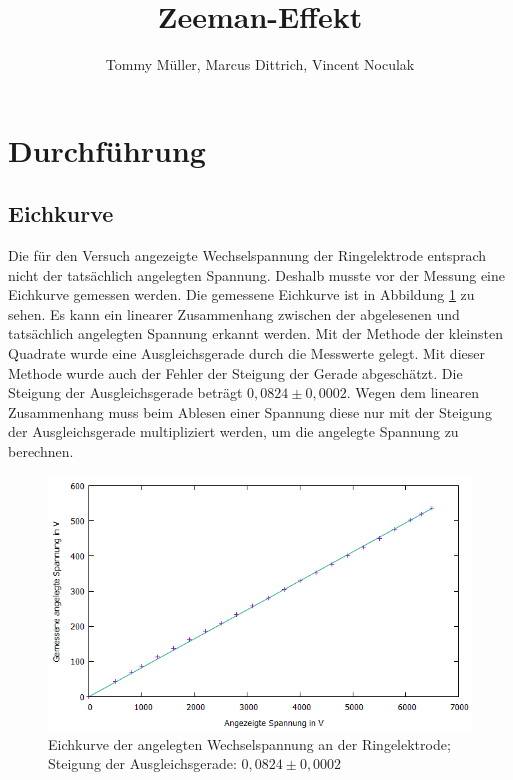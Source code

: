 \documentclass[10pt,a4paper]{article}
\author{Tommy Müller, Marcus Dittrich, Vincent Noculak}
\title{Zeeman-Effekt}
\begin{document}
\maketitle
\newpage
\tableofcontents
\newpage

\section{Durchführung}

\subsection{Eichkurve}

Die für den Versuch angezeigte Wechselspannung der Ringelektrode entsprach nicht der tatsächlich angelegten Spannung. Deshalb musste vor der Messung eine Eichkurve gemessen werden. Die gemessene Eichkurve ist in Abbildung \ref{eichkurve1} zu sehen. Es kann ein linearer Zusammenhang zwischen der abgelesenen und tatsächlich angelegten Spannung erkannt werden. Mit der Methode der kleinsten Quadrate wurde eine Ausgleichsgerade durch die Messwerte gelegt. Mit dieser Methode wurde auch der Fehler der Steigung der Gerade abgeschätzt. Die Steigung der Ausgleichsgerade beträgt $0,0824 \pm 0,0002$. Wegen dem linearen Zusammenhang muss beim Ablesen einer Spannung diese nur mit der Steigung der Ausgleichsgerade multipliziert werden, um die angelegte Spannung zu berechnen.

\begin{figure}[h]
	\includegraphics[scale = 0.7]{eichkurve.png}
	\centering
	\caption{Eichkurve der angelegten Wechselspannung an der Ringelektrode; Steigung der Ausgleichsgerade: $0,0824 \pm 0,0002$}
	\label{eichkurve1}
\end{figure}
\end{document}
